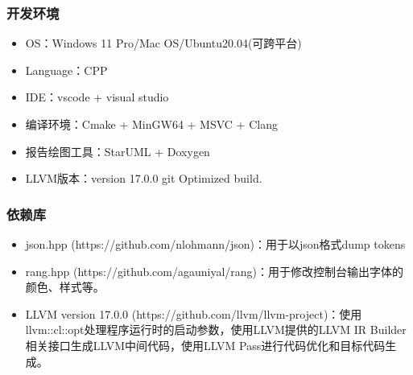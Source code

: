 \begin{frame}
    \frametitle{开发环境}
    \footnotesize
    \begin{itemize}
        \item {OS：Windows 11 Pro/Mac OS/Ubuntu20.04(可跨平台)}
        \item {Language：CPP}
        \item {IDE：vscode + visual studio}
        \item {编译环境：Cmake + MinGW64 + MSVC + Clang}
        \item {报告绘图工具：StarUML + Doxygen}
        \item {LLVM版本：version 17.0.0 git Optimized build.}
    \end{itemize}
\end{frame}

\begin{frame}
    \frametitle{依赖库}
    \footnotesize
    \begin{itemize}
        \item {json.hpp (https://github.com/nlohmann/json)：用于以json格式dump tokens}
        \item {rang.hpp (https://github.com/agauniyal/rang)：用于修改控制台输出字体的颜色、样式等。}
        \item {LLVM version 17.0.0 (https://github.com/llvm/llvm-project)：使用llvm::cl::opt处理程序运行时的启动参数，使用LLVM提供的LLVM IR Builder相关接口生成LLVM中间代码，使用LLVM Pass进行代码优化和目标代码生成。}
    \end{itemize}
\end{frame}